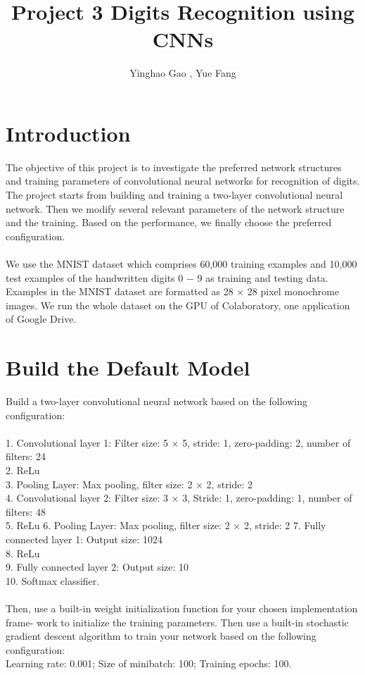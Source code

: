 \documentclass[a4paper]{article}
\title{Project 3 Digits Recognition using CNNs}
\author{Yinghao Gao ,   Yue Fang}
\begin{document}
\maketitle

\section{Introduction}
The objective of this project is to investigate the preferred network structures and training
parameters of convolutional neural networks for recognition of digits.  The project starts
from  building  and  training  a  two-layer  convolutional  neural  network.   Then  we  modify  several  relevant  parameters  of  the  network
structure  and  the  training.   Based  on  the  performance,  we  finally  choose  the  preferred
configuration.\\\\We use the MNIST dataset which comprises 60,000 training examples and 10,000 test
examples  of  the  handwritten  digits  0
−
9  as  training  and  testing  data.   Examples  in  the
MNIST dataset are formatted as 28
×
28 pixel monochrome images. We run the whole dataset on the GPU of Colaboratory, one application of Google Drive.

\section{Build the Default Model}
Build a two-layer convolutional neural network based on the following configuration:\\
\\1.  Convolutional layer 1:  Filter size:  5
×
5, stride:  1, zero-padding:  2, number of filters:  24
\\2.  ReLu
\\3.  Pooling Layer:  Max pooling, filter size:  2
×
2, stride:  2
\\4.  Convolutional layer 2:  Filter size:  3
×
3, Stride:  1, zero-padding:  1, number of filters:  48
\\5.  ReLu
6.  Pooling Layer:  Max pooling, filter size:  2
×
2, stride:  2
7.  Fully connected layer 1:  Output size:  1024
\\8.  ReLu
\\9.  Fully connected layer 2:  Output size:  10
\\10.  Softmax classifier.\\
\\Then,  use a built-in weight initialization function for your chosen implementation frame-
work to initialize the training parameters.  Then use a built-in stochastic gradient descent
algorithm to train your network based on the following configuration:
\\Learning rate:  0.001; Size of minibatch:  100; Training epochs:  100.
 
\end{document}
